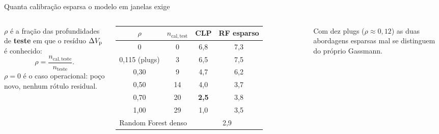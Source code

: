 \documentclass[aspectratio=169,10pt]{beamer}
\begin{document}
\begin{frame}{Quanta calibração esparsa o modelo em janelas exige}
  \begin{columns}[T,onlytextwidth]
    \footnotesize
    $\rho$ é a fração das profundidades de \textbf{teste} em que o resíduo
    $\Delta V_{\mathrm{p}}$ é conhecido:
    \[
      \rho = \frac{n_{\mathrm{cal,teste}}}{n_{\mathrm{teste}}}.
    \]
    $\rho=0$ é o caso operacional: poço novo, nenhum rótulo residual.
    \par
    \vspace{0.06cm}
    {\centering
    \scriptsize
    \setlength{\tabcolsep}{5pt}
    \begin{tabular}{cccc}
      \toprule
      $\rho$ & $n_{\mathrm{cal,test}}$ & CLP & RF esparso \\
      \midrule
      0 & 0 & 6,8 & 7,3 \\
      0,115 (plugs) & 3 & 6,5 & 7,5 \\
      0,30 & 9 & 4,7 & 6,2 \\
      0,50 & 14 & 4,0 & 3,7 \\
      0,70 & 20 & \textbf{2,5} & 3,8 \\
      1,00 & 29 & 1,0 & 3,5 \\
      \midrule
      \multicolumn{2}{l}{Random Forest denso} & \multicolumn{2}{c}{2,9} \\
      \bottomrule
    \end{tabular}
    \par}
    \vspace{0.08cm}
    {\scriptsize Com dez plugs ($\rho \approx 0{,}12$) as duas abordagens
    esparsas mal se distinguem do próprio Gassmann.}
  \end{columns}
\end{frame}
\end{document}
